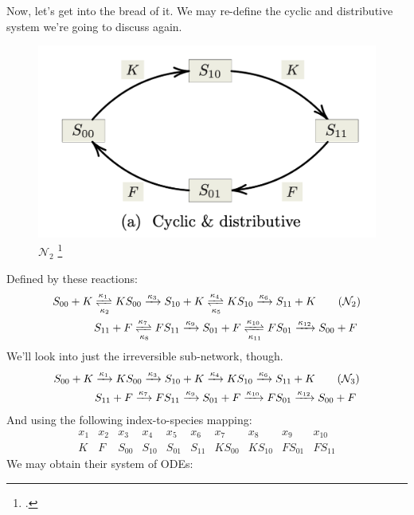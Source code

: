 Now, let's get into the bread of it. We may re-define the cyclic and distributive system we're going to discuss again.
\begin{figure}[H]
	\includegraphics[width=13cm]{math_pics/cyclic-distributive-n1.png}	
	\centering
	\caption{$\mathcal{N}_2$ \footcite{conradi2024}}
\end{figure}
Defined by these reactions:
\begin{align}\label{network2}
	S_{00} + K \xrightleftharpoons[ \kappa_2 ]{\kappa_1} KS_{00} \xrightarrow{\kappa_3} S_{10} + K \xrightleftharpoons[ \kappa_5 ]{\kappa_4} KS_{10} \xrightarrow{\kappa_6} S_{11} + K \tag{$\mathcal{N}_2$}
	\\
	S_{11} + F \xrightleftharpoons[ \kappa_8 ]{\kappa_7} FS_{11} \xrightarrow{\kappa_9} S_{01} + F \xrightleftharpoons[ \kappa_{11} ]{\kappa_{10}} FS_{01} \xrightarrow{\kappa_{12}} S_{00} + F \ \notag
\end{align}
We'll look into just the irreversible sub-network, though.
\begin{align}\label{network2_irr}
	S_{00} + K \xrightarrow{\kappa_1} KS_{00} \xrightarrow{\kappa_3} S_{10} + K \xrightarrow{\kappa_4} KS_{10} \xrightarrow{\kappa_6} S_{11} + K \tag{$\mathcal{N}_3$}
	\\
	S_{11} + F \xrightarrow{\kappa_7} FS_{11} \xrightarrow{\kappa_9} S_{01} + F \xrightarrow{\kappa_{10}} FS_{01} \xrightarrow{\kappa_{12}} S_{00} + F \ \notag
\end{align}
And using the following index-to-species mapping:
\[
	\begin{array}{ccccccccccc}x_{1}&x_{2}&x_{3}&x_{4}&x_{5}&x_{6}&x_{7}&x_{8}&x_{9}&x_{10}\\K&F&S_{00}&S_{10}&S_{01}&S_{11}&KS_{00}&KS_{10}&FS_{01}&FS_{11}
	\end{array}
\]
We may obtain their system of ODEs:

